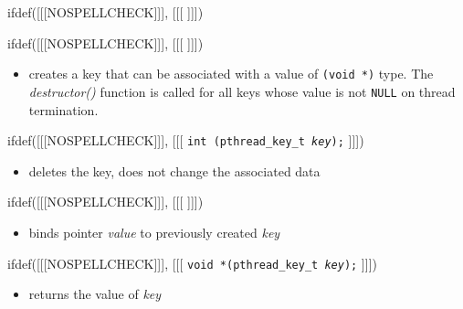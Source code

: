 
ifdef([[[NOSPELLCHECK]]], [[[
]]])

\begin{slide}
ifdef([[[NOSPELLCHECK]]], [[[
]]])
\begin{itemize}
\item creates a key that can be associated with a value of
\texttt{(void *)} type. The \emph{destructor()} function is called for all keys
whose value is not \texttt{NULL} on thread termination.
\end{itemize}
ifdef([[[NOSPELLCHECK]]], [[[
\texttt{int (pthread\_key\_t \emph{key});}
]]])
\begin{itemize}
\item deletes the key, does not change the associated data
\end{itemize}
ifdef([[[NOSPELLCHECK]]], [[[
]]])
\begin{itemize}
\item binds pointer \emph{value} to previously created \emph{key}
\end{itemize}
ifdef([[[NOSPELLCHECK]]], [[[
\texttt{void *(pthread\_key\_t \emph{key});}
]]])
\begin{itemize}
\item returns the value of \emph{key}
\end{itemize}
\end{slide}

